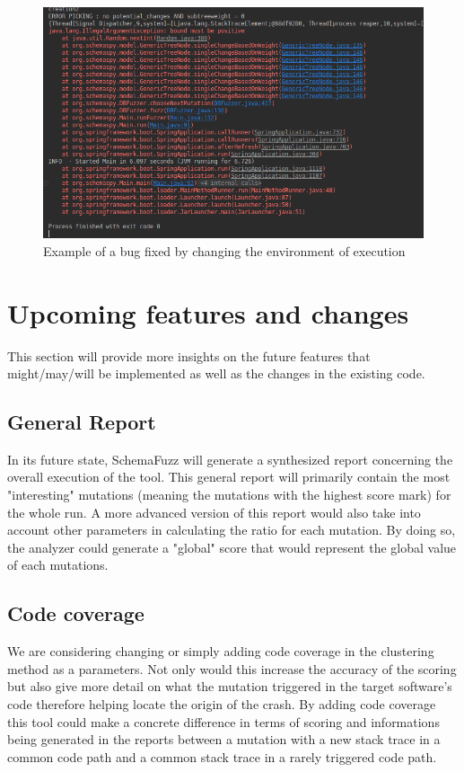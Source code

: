 \documentclass{article}
\begin{document}
\begin{empfile}
		\clearpage
		\bigskip
		\begin{figure} [h!]
			\includegraphics[width=\textwidth]{sc4.png}
			\caption{Example of a bug fixed by changing the environment of execution}
		\end{figure}
		\bigskip
   	       		
	
	\section{Upcoming features and changes}
This section will provide more insights on the future features that might/may/will be implemented as well as the changes in the existing code.

		\subsection{General Report}
In its future state, SchemaFuzz will generate a synthesized report concerning the overall execution of the tool. This general report will primarily contain the most "interesting" mutations (meaning the mutations with the highest score mark) for the whole run. A more advanced version of this report would also take into account other parameters in calculating the ratio for each mutation. By doing so, the analyzer could generate a "global" score that would represent the global value of each mutations.
	
		\subsection{Code coverage}
We are considering changing or simply adding code coverage in the clustering method as a parameters. Not only would this increase the accuracy of the scoring but also give more detail on what the mutation triggered in the target software's code therefore helping locate the origin of the crash. By adding code coverage this tool could make a concrete difference in terms of scoring and informations being generated in the reports between a mutation with a new stack trace in a common code path and a common stack trace in a rarely triggered code path.


\end{empfile}
\end{document}
